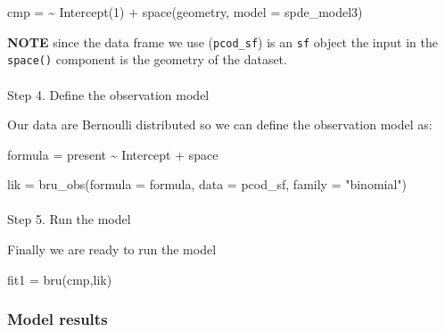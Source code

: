 \documentclass[
  letterpaper,
  DIV=11,
  numbers=noendperiod]{scrartcl}
\makeatletter
\let\oldparagraph\paragraph
\renewcommand{\paragraph}{
    \@ifstar
      \xxxParagraphStar
      \xxxParagraphNoStar
  }
\newcommand{\xxxParagraphStar}[1]{\oldparagraph*{#1}\mbox{}}
\newcommand{\xxxParagraphNoStar}[1]{\oldparagraph{#1}\mbox{}}
\newenvironment{Shaded}{\begin{snugshade}}{\end{snugshade}}
\newcommand{\AttributeTok}[1]{\textcolor[rgb]{0.40,0.45,0.13}{#1}}
\newcommand{\DecValTok}[1]{\textcolor[rgb]{0.68,0.00,0.00}{#1}}
\newcommand{\ErrorTok}[1]{\textcolor[rgb]{0.68,0.00,0.00}{#1}}
\newcommand{\FunctionTok}[1]{\textcolor[rgb]{0.28,0.35,0.67}{#1}}
\newcommand{\NormalTok}[1]{\textcolor[rgb]{0.00,0.23,0.31}{#1}}
\newcommand{\OtherTok}[1]{\textcolor[rgb]{0.00,0.23,0.31}{#1}}
\newcommand{\SpecialCharTok}[1]{\textcolor[rgb]{0.37,0.37,0.37}{#1}}
\newcommand{\StringTok}[1]{\textcolor[rgb]{0.13,0.47,0.30}{#1}}
\makeatother
\begin{document}
\begin{Shaded}
\begin{Highlighting}[]
\NormalTok{cmp }\OtherTok{=} \ErrorTok{\textasciitilde{}} \FunctionTok{Intercept}\NormalTok{(}\DecValTok{1}\NormalTok{) }\SpecialCharTok{+} \FunctionTok{space}\NormalTok{(geometry, }\AttributeTok{model =}\NormalTok{ spde\_model3)}
\end{Highlighting}
\end{Shaded}

\textbf{NOTE} since the data frame we use (\texttt{pcod\_sf}) is an
\texttt{sf} object the input in the \texttt{space()} component is the
geometry of the dataset.

\paragraph{Step 4. Define the observation
model}\label{step-4.-define-the-observation-model}

Our data are Bernoulli distributed so we can define the observation
model as:

\begin{Shaded}
\begin{Highlighting}[]
\NormalTok{formula }\OtherTok{=}\NormalTok{ present }\SpecialCharTok{\textasciitilde{}}\NormalTok{ Intercept  }\SpecialCharTok{+}\NormalTok{ space}

\NormalTok{lik }\OtherTok{=} \FunctionTok{bru\_obs}\NormalTok{(}\AttributeTok{formula =}\NormalTok{ formula, }
              \AttributeTok{data =}\NormalTok{ pcod\_sf, }
              \AttributeTok{family =} \StringTok{"binomial"}\NormalTok{)}
\end{Highlighting}
\end{Shaded}

\paragraph{Step 5. Run the model}\label{step-5.-run-the-model}

Finally we are ready to run the model

\begin{Shaded}
\begin{Highlighting}[]
\NormalTok{fit1 }\OtherTok{=} \FunctionTok{bru}\NormalTok{(cmp,lik)}
\end{Highlighting}
\end{Shaded}

\subsubsection{Model results}\label{model-results}
\end{document}
